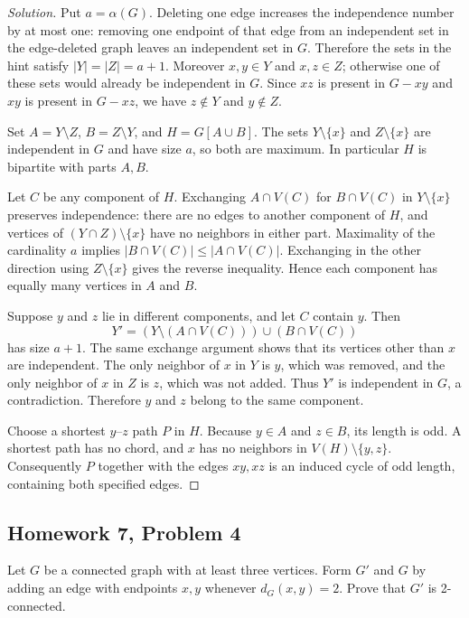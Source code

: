 \documentclass[12pt]{amsart}
\newenvironment{solution}{\begin{proof}[Solution]}{\end{proof}}
\begin{document}
    \begin{solution}

        Put $a=\alpha(G)$. Deleting one edge increases the independence
        number by at most one: removing one endpoint of that edge from an
        independent set in the edge-deleted graph leaves an independent set
        in $G$. Therefore the sets in the hint satisfy
        $|Y|=|Z|=a+1$. Moreover $x,y\in Y$ and $x,z\in Z$; otherwise
        one of these sets would already be independent in $G$. Since $xz$
        is present in $G-xy$ and $xy$ is present in $G-xz$, we have
        $z\notin Y$ and $y\notin Z$.

        Set $A=Y\setminus Z$, $B=Z\setminus Y$, and $H=G[A\cup B]$.
        The sets $Y\setminus\{x\}$ and $Z\setminus\{x\}$ are independent
        in $G$ and have size $a$, so both are maximum. In particular $H$
        is bipartite with parts $A,B$.

        Let $C$ be any component of $H$. Exchanging $A\cap V(C)$ for
        $B\cap V(C)$ in $Y\setminus\{x\}$ preserves independence:
        there are no edges to another component of $H$, and vertices of
        $(Y\cap Z)\setminus\{x\}$ have no neighbors in either part.
        Maximality of the cardinality $a$ implies
        $|B\cap V(C)|\le |A\cap V(C)|$. Exchanging in the other direction
        using $Z\setminus\{x\}$ gives the reverse inequality. Hence each
        component has equally many vertices in $A$ and $B$.

        Suppose $y$ and $z$ lie in different components, and let $C$ contain
        $y$. Then
        \[
            Y'=(Y\setminus(A\cap V(C)))\cup(B\cap V(C))
        \]
        has size $a+1$. The same exchange argument shows that its vertices
        other than $x$ are independent. The only neighbor of $x$ in $Y$
        is $y$, which was removed, and the only neighbor of $x$ in $Z$ is
        $z$, which was not added. Thus $Y'$ is independent in $G$, a
        contradiction. Therefore $y$ and $z$ belong to the same component.

        Choose a shortest $y$--$z$ path $P$ in $H$. Because $y\in A$ and
        $z\in B$, its length is odd. A shortest path has no chord, and $x$
        has no neighbors in $V(H)\setminus\{y,z\}$. Consequently $P$
        together with the edges $xy,xz$ is an induced cycle of odd length,
        containing both specified edges.
    \end{solution}

    \subsection*{Homework 7, Problem 4} Let $G$ be a connected graph with at least three vertices.
    Form $G'$ and $G$ by adding an edge with endpoints $x,y$ whenever $d_G(x,y) = 2$.
    Prove that $G'$ is 2-connected.
\end{document}
